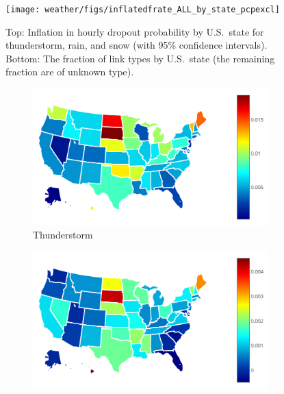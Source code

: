 
\begin{figure}[t]
\centering
\texttt{[image: weather/figs/inflatedfrate\_ALL\_by\_state\_pcpexcl]}
\caption{\label{fig:inflatedfrate_by_state_pcp}
\figdone
Top: Inflation in hourly dropout probability by U.S.~state for thunderstorm, rain, and
	snow (with 95\% confidence intervals). Bottom: The fraction of link
	types by U.S.~state (the remaining fraction are of unknown type).
	}
\end{figure}


\begin{figure}[t]
\begin{subfigure}[t]{0.32\linewidth}
\centering
\includegraphics[width=\linewidth]{weather/figs/normalizedfratebyexclweather_ALL_iststorm_statewise_jan11todec17_heatmap}
\caption{
\label{fig:inflatedfrate_tstorm_usmap}
Thunderstorm
}
\end{subfigure}
%
\begin{subfigure}[t]{0.32\linewidth}
\centering
\includegraphics[width=\linewidth]{weather/figs/normalizedfratebyexclweather_ALL_israin_statewise_jan11todec17_heatmap}

\end{subfigure}
\end{figure}
